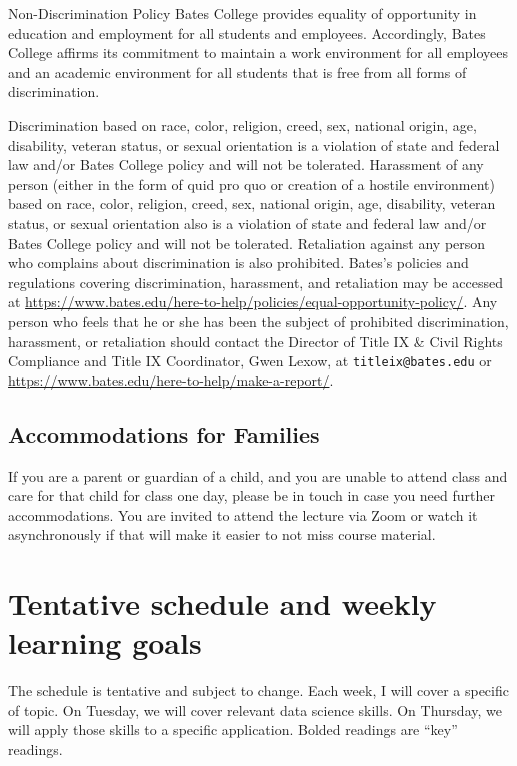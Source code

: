 \documentclass[11pt]{article}
\begin{document}
\footnotesize{Non-Discrimination Policy Bates College provides equality of opportunity in education and employment for all students and employees. Accordingly, Bates College affirms its commitment to maintain a work environment for all employees and an academic environment for all students that is free from all forms of discrimination.}

\footnotesize{Discrimination based on race, color, religion, creed, sex, national origin, age, disability, veteran status, or sexual orientation is a violation of state and federal law and/or Bates College policy and will not be tolerated. Harassment of any person (either in the form of quid pro quo or creation of a hostile environment) based on race, color, religion, creed, sex, national origin, age, disability, veteran status, or sexual orientation also is a violation of state and federal law and/or Bates College policy and will not be tolerated. Retaliation against any person who complains about discrimination is also prohibited. Bates's policies and regulations covering discrimination, harassment, and retaliation may be accessed at \url{https://www.bates.edu/here-to-help/policies/equal-opportunity-policy/}. Any person who feels that he or she has been the subject of prohibited discrimination, harassment, or retaliation should contact the Director of Title IX \& Civil Rights Compliance and Title IX Coordinator, Gwen Lexow, at \texttt{titleix@bates.edu} or \url{https://www.bates.edu/here-to-help/make-a-report/}.}

\subsection*{Accommodations for Families}

\footnotesize{If you are a parent or guardian of a child, and you are unable to attend class and care for that child for class one day, please be in touch in case you need further accommodations. You are invited to attend the lecture via Zoom or watch it asynchronously if that will make it easier to not miss course material.}


\newpage
\section*{Tentative schedule and weekly learning goals}
\label{sec:sched}
The schedule is tentative and subject to change. Each week, I will cover a specific of topic. On Tuesday, we will cover relevant data science skills. On Thursday, we will apply those skills to a specific application. Bolded readings are ``key'' readings.
\end{document}
